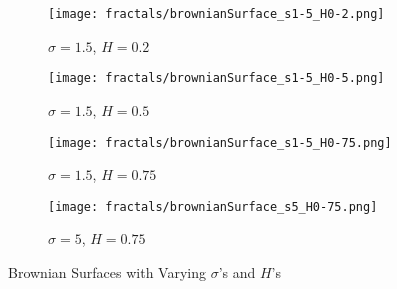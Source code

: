 \begin{figure}[tbh]
\begin{center}
	\begin{subfigure}[tbh]{0.475\textwidth}
	\begin{center}
	\texttt{[image: fractals/brownianSurface\_s1-5\_H0-2.png]}
	\caption{ $\sigma = 1.5$, $H = 0.2$ }
	\end{center}
	\end{subfigure}
\hfill
	\begin{subfigure}[tbh]{0.475\textwidth}
	\begin{center}
	\texttt{[image: fractals/brownianSurface\_s1-5\_H0-5.png]}
	\caption{$\sigma = 1.5$, $H = 0.5$}
	\end{center}
	\end{subfigure}
\hfill
	\begin{subfigure}[tbh]{0.475\textwidth}
	\begin{center}
	\texttt{[image: fractals/brownianSurface\_s1-5\_H0-75.png]}
	\caption{ $\sigma = 1.5$, $H = 0.75$ }
	\end{center}
	\end{subfigure}
\hfill
	\begin{subfigure}[tbh]{0.475\textwidth}
	\begin{center}
	\texttt{[image: fractals/brownianSurface\_s5\_H0-75.png]}
	\caption{ $\sigma = 5$, $H = 0.75$ }
	\end{center}
	\end{subfigure}
\hfill

\end{center}
\caption{Brownian Surfaces with Varying $\sigma$'s and $H$'s \label{surfaces} }
\end{figure}
